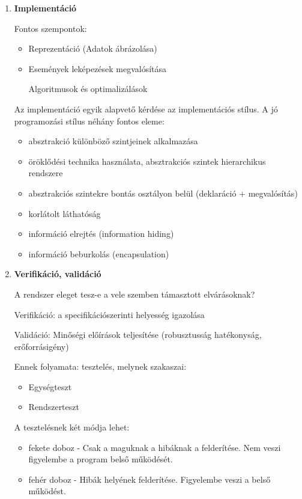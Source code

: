 \documentclass[12pt,margin=0px]{article}
\begin{document}
\begin{enumerate}
			\item \textbf{Implementáció}
			
				Fontos szempontok:
				\begin{itemize}
					\item Reprezentáció (Adatok ábrázolása)
					\item Események leképezések megvalósítása
	
						Algoritmusok és optimalizálások
				\end{itemize}
				
				Az implementáció egyik alapvető kérdése az implementációs stílus.
				A jó programozási stílus néhány fontos eleme:
				\begin{itemize}
					\item absztrakció különböző szintjeinek alkalmazása
					\item öröklődési technika használata, absztrakciós szintek hierarchikus
					rendszere
					\item absztrakciós szintekre bontás osztályon belül (deklaráció + megvalósítás)
					\item korlátolt láthatóság
					\item információ elrejtés (information hiding)
					\item információ beburkolás (encapsulation)
				\end{itemize}
				
			\item \textbf{Verifikáció, validáció}
			
			A rendszer eleget tesz-e a vele szemben támasztott elvárásoknak?
			
			Verifikáció: a specifikációszerinti helyesség igazolása
			
			Validáció: Minőségi előírások teljesítése (robusztusság hatékonyság, erőforrásigény)
			
			Ennek folyamata: tesztelés, melynek szakaszai:
			\begin{itemize}
				\item Egységteszt
				\item Rendszerteszt
			\end{itemize}
			A tesztelésnek két módja lehet:
			\begin{itemize}
				\item fekete doboz - Csak a maguknak a hibáknak a felderítése. Nem veszi figyelembe a program belső működését.
				\item fehér doboz - Hibák helyének felderítése. Figyelembe veszi a belső működést.
			\end{itemize}
			

\end{enumerate}
\end{document}
